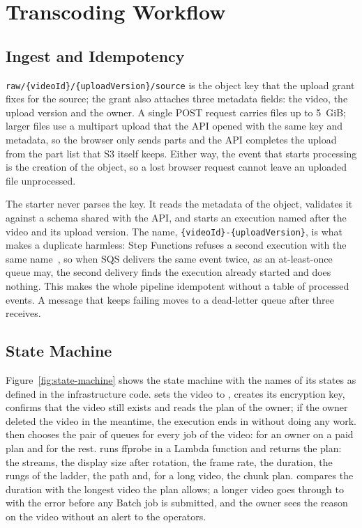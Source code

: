 \section{Transcoding Workflow}
\label{sec:workflow-design}

\subsection{Ingest and Idempotency}
\label{sec:ingest}

\mbox{\texttt{raw/\{videoId\}/\{uploadVersion\}/source}} is the object key that the upload grant
fixes for the source; the grant also attaches three metadata fields: the video, the upload version
and the owner. A single POST
request carries files up to 5~GiB; larger files use a multipart upload that the API opened with the
same key and metadata, so the browser only sends parts and the API completes the upload from the part
list that S3 itself keeps. Either way, the event that starts processing is the creation of the
object, so a lost browser request cannot leave an uploaded file unprocessed.

The starter never parses the key. It reads the metadata of the object, validates it against a schema
shared with the API, and starts an execution named after the video and its upload version. The name,
\mbox{\texttt{\{videoId\}-\{uploadVersion\}}}, is what makes a duplicate harmless: Step Functions refuses a second execution with the same name~\cite{awsstepfunctions}, so when SQS delivers
the same event twice, as an at-least-once queue may, the second delivery finds the execution already
started and does nothing. This makes the whole pipeline idempotent without a table of processed
events. A message that keeps failing moves to a dead-letter queue after three receives.

\subsection{State Machine}
\label{sec:state-machine}

Figure~\ref{fig:state-machine} shows the state machine with the names of its states as defined in
the infrastructure code.  sets the video to , creates its
encryption key, confirms that the video still exists and reads the plan of the owner; if the owner
deleted the video in the meantime, the execution ends in  without doing any work.
 then chooses the pair of queues for every job of the video:  for
an owner on a paid plan and  for the rest.  runs ffprobe in a Lambda
function and returns the plan: the streams, the display size after rotation, the frame rate, the
duration, the rungs of the ladder, the path and, for a long video, the chunk plan.
 compares the duration with the longest video the plan allows; a longer video goes
through  to  with the error  before any Batch job is
submitted, and the owner sees the reason on the video without an alert to the operators.

